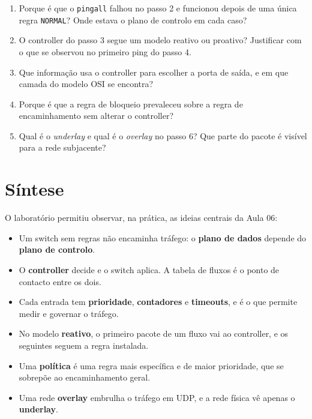 \documentclass[11pt,a4paper]{article}
\newcommand{\cmd}[1]{\texttt{#1}}
\begin{document}
\begin{enumerate}
  \item Porque é que o \cmd{pingall} falhou no passo 2 e funcionou depois de uma única regra \cmd{NORMAL}? Onde estava o plano de controlo em cada caso?
  \item O controller do passo 3 segue um modelo reativo ou proativo? Justificar com o que se observou no primeiro ping do passo 4.
  \item Que informação usa o controller para escolher a porta de saída, e em que camada do modelo OSI se encontra?
  \item Porque é que a regra de bloqueio prevaleceu sobre a regra de encaminhamento sem alterar o controller?
  \item Qual é o \emph{underlay} e qual é o \emph{overlay} no passo 6? Que parte do pacote é visível para a rede subjacente?
\end{enumerate}

\section*{Síntese}

O laboratório permitiu observar, na prática, as ideias centrais da Aula 06:

\begin{itemize}
  \item Um switch sem regras não encaminha tráfego: o \textbf{plano de dados} depende do \textbf{plano de controlo}.
  \item O \textbf{controller} decide e o switch aplica. A tabela de fluxos é o ponto de contacto entre os dois.
  \item Cada entrada tem \textbf{prioridade}, \textbf{contadores} e \textbf{timeouts}, e é o que permite medir e governar o tráfego.
  \item No modelo \textbf{reativo}, o primeiro pacote de um fluxo vai ao controller, e os seguintes seguem a regra instalada.
  \item Uma \textbf{política} é uma regra mais específica e de maior prioridade, que se sobrepõe ao encaminhamento geral.
  \item Uma rede \textbf{overlay} embrulha o tráfego em UDP, e a rede física vê apenas o \textbf{underlay}.
\end{itemize}
\end{document}
